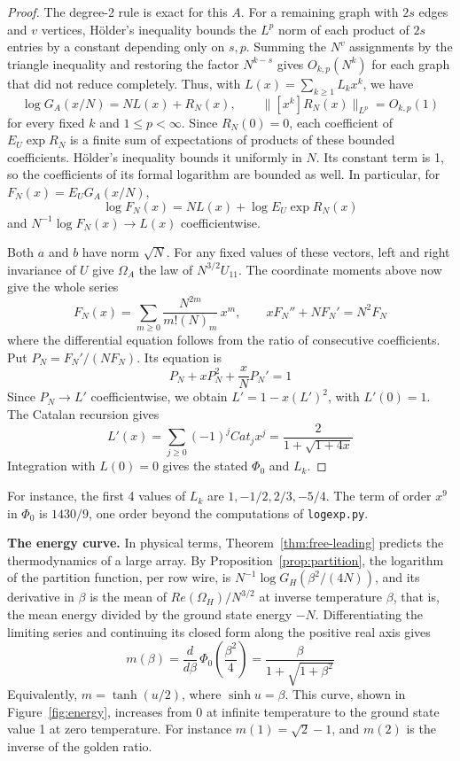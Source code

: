 \documentclass[11pt,a4paper]{article}
\theoremstyle{remark}
\begin{document}
\begin{proof}
The degree-2 rule is exact for this $A$. For a remaining graph with
$2s$ edges and $v$ vertices, H\"older's inequality bounds the $L^p$ norm
of each product of $2s$ entries by a constant depending only on $s,p$.
Summing the $N^v$ assignments by the triangle inequality and restoring
the factor $N^{k-s}$ gives $O_{k,p}(N^k)$ for each graph that did not
reduce completely. Thus, with $L(x)=\sum_{k\geq1}L_kx^k$, we have
\[
 \log G_A(x/N)=N L(x)+R_N(x),\qquad
 \big\|[x^k]R_N(x)\big\|_{L^p}=O_{k,p}(1)
\]
for every fixed $k$ and $1\leq p<\infty$. Since $R_N(0)=0$,
each coefficient of $E_U\exp R_N$ is a finite sum of expectations of
products of these bounded coefficients. H\"older's inequality bounds it
uniformly in $N$. Its constant term is 1, so the coefficients of its
formal logarithm are bounded as well. In particular, for $F_N(x)=E_U G_A(x/N)$,
\[
 \log F_N(x)=N L(x)+\log E_U\exp R_N(x)
\]
and $N^{-1}\log F_N(x)\to L(x)$ coefficientwise.

Both $a$ and $b$ have norm $\sqrt N$. For any fixed values of these
vectors, left and right invariance of $U$ give $\Omega_A$ the law of
$N^{3/2}U_{11}$. The coordinate moments above now give the whole series
\[
 F_N(x)=\sum_{m\geq0}\frac{N^{2m}}{m!(N)_m}\,x^m,
 \qquad xF_N''+NF_N'=N^2F_N
\]
where the differential equation follows from the ratio of consecutive
coefficients. Put $P_N=F_N'/(NF_N)$. Its equation is
\[
 P_N+xP_N^2+\frac{x}{N}P_N'=1
\]
Since $P_N\to L'$ coefficientwise, we obtain $L'=1-x(L')^2$, with
$L'(0)=1$. The Catalan recursion gives
\[
 L'(x)=\sum_{j\geq0}(-1)^jCat_j x^j
      =\frac{2}{1+\sqrt{1+4x}}
\]
Integration with $L(0)=0$ gives the stated $\Phi_0$ and $L_k$.
\end{proof}

For instance, the first 4 values of $L_k$ are
$1,-1/2,2/3,-5/4$. The term of order $x^9$ in $\Phi_0$ is $1430/9$,
one order beyond the computations of \texttt{logexp.py}.

\medskip
\noindent\textbf{The energy curve.}
In physical terms, Theorem~\ref{thm:free-leading} predicts the thermodynamics of a large array. By Proposition~\ref{prop:partition}, the logarithm of the partition function, per row wire, is $N^{-1}\log G_H(\beta^2/(4N))$, and its derivative in $\beta$ is the mean of $Re(\Omega_H)/N^{3/2}$ at inverse temperature $\beta$, that is, the mean energy divided by the ground state energy $-N$. Differentiating the limiting series and continuing its closed form along the positive real axis gives
\[
 m(\beta)=\frac{d}{d\beta}\,\Phi_0\left(\frac{\beta^2}4\right)=\frac{\beta}{1+\sqrt{1+\beta^2}}
\]
Equivalently, $m=\tanh(u/2)$, where $\sinh u=\beta$. This curve, shown in Figure~\ref{fig:energy}, increases from 0 at infinite temperature to the ground state value 1 at zero temperature. For instance $m(1)=\sqrt2-1$, and $m(2)$ is the inverse of the golden ratio.
\end{document}

